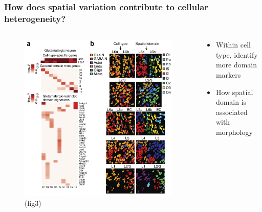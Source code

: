 \documentclass{beamer}
\begin{document}
  \begin{frame}
  \frametitle{How does spatial variation contribute to cellular heterogeneity?}
  \begin{columns}
  \begin{column}{0.6\textwidth}
    \begin{figure}
      \centering
      \includegraphics[width=\textwidth]{heter} (fig3)
    \end{figure}
  \end{column}
  \begin{column}{0.4\textwidth}  %
    \begin{itemize}
      \item Within cell type, identify more domain markers
      \item How spatial domain is associated with morphology
    \end{itemize}
  \end{column}
  \end{columns}
  \end{frame}
\end{document}
